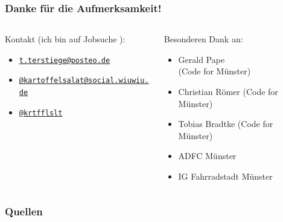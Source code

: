 \documentclass{beamer}
\begin{document}
\begin{frame}
  \frametitle{Danke für die Aufmerksamkeit!}
  
  \centering
  \begin{columns}
  \begin{column}{0.67\linewidth}
      Kontakt (ich bin auf Jobsuche \faSmileWink[regular]):
      \begin{itemize}
        \item[\faEnvelope] \href{mailto:t.terstiege@posteo.de}{\texttt{t.terstiege@posteo.de}}
        \item[\faMastodon] \href{https://social.wiuwiu.de/@kartoffelsalat}{\texttt{@kartoffelsalat@social.wiuwiu.de}}
        \item[\faTwitter]  \href{https://twitter.com/krtfflslt}{\texttt{@krtfflslt}}
      \end{itemize}
    \end{column}
    \hfill
    \begin{column}{0.36\linewidth}
      Besonderen Dank an:
      \begin{itemize}
        \item Gerald Pape\\(Code for Münster)
        \item Christian Römer (Code for Münster)
        \item Tobias Bradtke (Code for Münster)
        \item ADFC Münster
        \item IG Fahrradstadt Münster
      \end{itemize}
    \end{column}
  \end{columns}

\end{frame}

\begin{frame}
  \frametitle{Quellen}
  \printbibliography[title=Quellen]
\end{frame}
\end{document}
